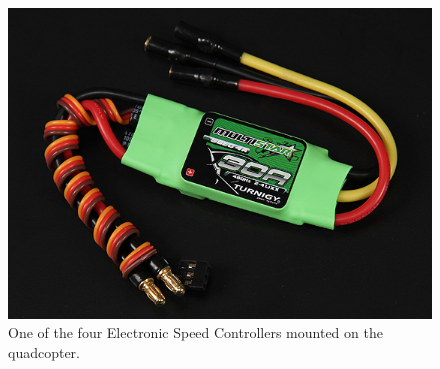 %
\begin{figure}[H]
	\centering
	\includegraphics[scale=0.4]{figures/ESC}
	\caption{One of the four Electronic Speed Controllers mounted on the quadcopter.\cite{HKing}}
	\label{fig:esc}
\end{figure}
%
